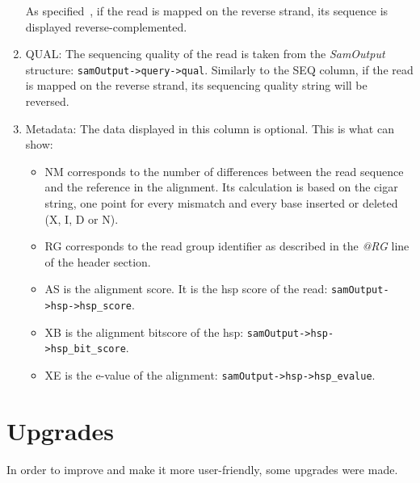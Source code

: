 \begin{enumerate}
    As specified~\cite{samspec}, if the read is mapped on the reverse strand, its sequence is displayed reverse-complemented.
    \item QUAL\@: The sequencing quality of the read is taken from the \emph{SamOutput} structure: \texttt{samOutput->\allowbreak{}query->\allowbreak{}qual}.
    Similarly to the SEQ column, if the read is mapped on the reverse strand, its sequencing quality string will be reversed.
    \item Metadata: The data displayed in this column is optional. This is what \blastobam{} can show:
    \begin{itemize}
        \item NM corresponds to the number of differences between the read sequence and the reference in the alignment.
        Its calculation is based on the \gls{cigar} string, one point for every mismatch and every base inserted or deleted (X, I, D or N).
        \item RG corresponds to the read group identifier as described in the \emph{@RG} line of the header section.
        \item AS is the alignment score. It is the \gls{hsp} score of the read: \texttt{samOutput->\allowbreak{}hsp->\allowbreak{}hsp\_score}.
        \item XB is the alignment bitscore of the \gls{hsp}: \texttt{samOutput->\allowbreak{}hsp->\allowbreak{}hsp\_bit\_score}.
        \item XE is the e-value of the alignment: \texttt{samOutput->\allowbreak{}hsp->\allowbreak{}hsp\_evalue}.
    \end{itemize}
\end{enumerate}


\section{Upgrades}
In order to improve \blastobam{} and make it more user-friendly, some upgrades were made.



